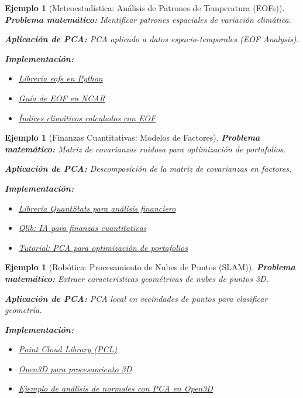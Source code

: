\documentclass[11pt]{article}
\theoremstyle{plain}
\newtheorem{example}[theorem]{Ejemplo}
\begin{document}
\begin{example}[Meteoestadística: Análisis de Patrones de Temperatura (EOFs)]
\label{ej:meteo}
\textbf{Problema matemático:} Identificar patrones espaciales de variación climática.

\textbf{Aplicación de PCA:} PCA aplicado a datos espacio-temporales (EOF Analysis).

\textbf{Implementación:}
\begin{itemize}
    \item \href{https://github.com/ajdawson/eofs}{Librería eofs en Python}
    \item \href{https://climatedataguide.ucar.edu/climate-data-tools-and-analysis/empirical-orthogonal-function-eof-analysis-and-rotated-eof-analysis}{Guía de EOF en NCAR}
    \item \href{https://www.esrl.noaa.gov/psd/data/climateindices/list/}{Índices climáticos calculados con EOF}
\end{itemize}
\end{example}

\begin{example}[Finanzas Cuantitativas: Modelos de Factores]
\label{ej:finanzas}
\textbf{Problema matemático:} Matriz de covarianzas ruidosa para optimización de portafolios.

\textbf{Aplicación de PCA:} Descomposición de la matriz de covarianzas en factores.

\textbf{Implementación:}
\begin{itemize}
    \item \href{https://github.com/ranaroussi/quantstats}{Librería QuantStats para análisis financiero}
    \item \href{https://github.com/microsoft/qlib}{Qlib: IA para finanzas cuantitativas}
    \item \href{https://towardsdatascience.com/principal-component-analysis-for-portfolio-optimization-1bbf64f7a33f}{Tutorial: PCA para optimización de portafolios}
\end{itemize}
\end{example}

\begin{example}[Robótica: Procesamiento de Nubes de Puntos (SLAM)]
\label{ej:robotica}
\textbf{Problema matemático:} Extraer características geométricas de nubes de puntos 3D.

\textbf{Aplicación de PCA:} PCA local en vecindades de puntos para clasificar geometría.

\textbf{Implementación:}
\begin{itemize}
    \item \href{https://github.com/PointCloudLibrary/pcl}{Point Cloud Library (PCL)}
    \item \href{https://github.com/isl-org/Open3D}{Open3D para procesamiento 3D}
    \item \href{http://www.open3d.org/docs/release/tutorial/geometry/pointcloud.html}{Ejemplo de análisis de normales con PCA en Open3D}
\end{itemize}
\end{example}
\end{document}
